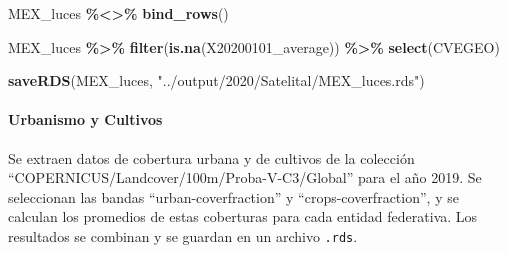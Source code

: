 \documentclass[
  12pt,
]{book}
\newenvironment{Shaded}{\begin{snugshade}}{\end{snugshade}}
\newcommand{\FunctionTok}[1]{\textcolor[rgb]{0.13,0.29,0.53}{\textbf{#1}}}
\newcommand{\NormalTok}[1]{#1}
\newcommand{\SpecialCharTok}[1]{\textcolor[rgb]{0.81,0.36,0.00}{\textbf{#1}}}
\newcommand{\StringTok}[1]{\textcolor[rgb]{0.31,0.60,0.02}{#1}}
\begin{document}
\begin{Shaded}
\begin{Highlighting}[]
\NormalTok{MEX\_luces }\SpecialCharTok{\%\textless{}\textgreater{}\%} \FunctionTok{bind\_rows}\NormalTok{()}

\NormalTok{MEX\_luces }\SpecialCharTok{\%\textgreater{}\%} \FunctionTok{filter}\NormalTok{(}\FunctionTok{is.na}\NormalTok{(X20200101\_average)) }\SpecialCharTok{\%\textgreater{}\%} \FunctionTok{select}\NormalTok{(CVEGEO) }


\FunctionTok{saveRDS}\NormalTok{(MEX\_luces, }\StringTok{"../output/2020/Satelital/MEX\_luces.rds"}\NormalTok{)}
\end{Highlighting}
\end{Shaded}

\hypertarget{urbanismo-y-cultivos}{%
\paragraph*{Urbanismo y Cultivos}\label{urbanismo-y-cultivos}}

Se extraen datos de cobertura urbana y de cultivos de la colección ``COPERNICUS/Landcover/100m/Proba-V-C3/Global'' para el año 2019. Se seleccionan las bandas ``urban-coverfraction'' y ``crops-coverfraction'', y se calculan los promedios de estas coberturas para cada entidad federativa. Los resultados se combinan y se guardan en un archivo \texttt{.rds}.
\end{document}

